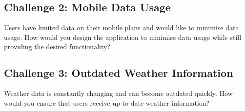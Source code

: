 \documentclass{csse4400}
\begin{document}
\subsection*{Challenge 2: Mobile Data Usage}
Users have limited data on their mobile plans and would like to minimise data usage.
How would you design the application to minimise data usage while still providing the desired functionality?

\subsection*{Challenge 3: Outdated Weather Information}
Weather data is constantly changing and can become outdated quickly.
How would you ensure that users receive up-to-date weather information?
\end{document}
